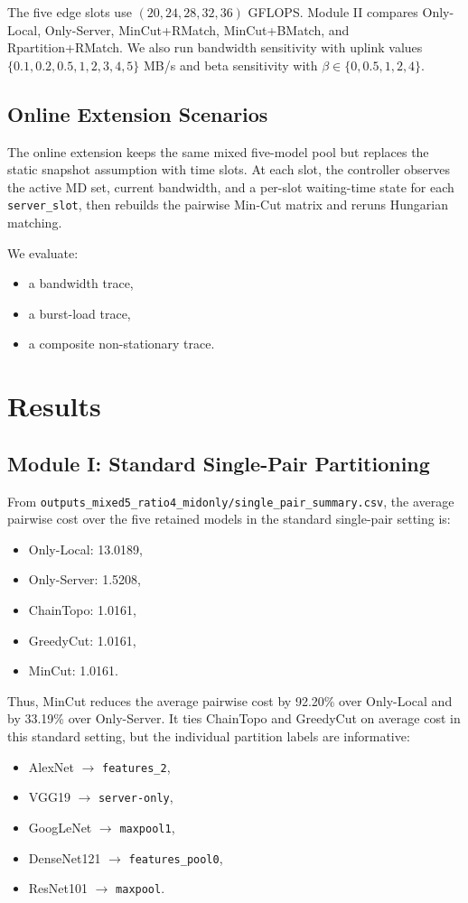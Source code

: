 \documentclass[conference]{IEEEtran}
\begin{document}
The five edge slots use $(20, 24, 28, 32, 36)$ GFLOPS. Module II compares
Only-Local, Only-Server, MinCut+RMatch, MinCut+BMatch, and Rpartition+RMatch.
We also run bandwidth sensitivity with uplink values
$\{0.1, 0.2, 0.5, 1, 2, 3, 4, 5\}$ MB/s and beta sensitivity with
$\beta \in \{0, 0.5, 1, 2, 4\}$.

\subsection{Online Extension Scenarios}

The online extension keeps the same mixed five-model pool but replaces the
static snapshot assumption with time slots. At each slot, the controller
observes the active MD set, current bandwidth, and a per-slot waiting-time
state for each \texttt{server\_slot}, then rebuilds the pairwise Min-Cut matrix
and reruns Hungarian matching.

We evaluate:
\begin{itemize}
\item a bandwidth trace,
\item a burst-load trace,
\item a composite non-stationary trace.
\end{itemize}

\section{Results}

\subsection{Module I: Standard Single-Pair Partitioning}

From \texttt{outputs\_mixed5\_ratio4\_midonly/single\_pair\_summary.csv}, the
average pairwise cost over the five retained models in the standard single-pair
setting is:
\begin{itemize}
\item Only-Local: 13.0189,
\item Only-Server: 1.5208,
\item ChainTopo: 1.0161,
\item GreedyCut: 1.0161,
\item MinCut: 1.0161.
\end{itemize}

Thus, MinCut reduces the average pairwise cost by 92.20\% over Only-Local and
by 33.19\% over Only-Server. It ties ChainTopo and GreedyCut on average cost
in this standard setting, but the individual partition labels are informative:
\begin{itemize}
\item AlexNet $\rightarrow$ \texttt{features\_2},
\item VGG19 $\rightarrow$ \texttt{server-only},
\item GoogLeNet $\rightarrow$ \texttt{maxpool1},
\item DenseNet121 $\rightarrow$ \texttt{features\_pool0},
\item ResNet101 $\rightarrow$ \texttt{maxpool}.
\end{itemize}
\end{document}
